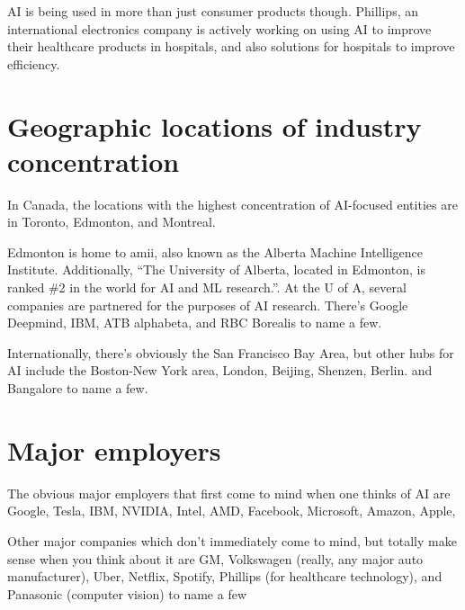 \documentclass[letterpaper,12pt]{article}
\begin{document}
AI is being used in more than just consumer products though. Phillips,
an international electronics company is actively working on using
AI to improve their healthcare products in hospitals, and also 
solutions for hospitals to improve efficiency.




\section{Geographic locations of industry concentration}

In Canada, the locations with the highest concentration of AI-focused
entities are in Toronto, Edmonton, and Montreal.\cite{investincanada}

Edmonton is home to amii, also known as the Alberta Machine Intelligence Institute.
Additionally, ``The University of Alberta, located in Edmonton, is ranked \#2 in the world for AI and ML research.''\cite{investincanada}\cite{edmonton.ai}.
At the U of A, several companies are partnered for the purposes of AI research.
There's Google Deepmind, IBM, ATB alphabeta, and RBC Borealis to name a few.

Internationally, there's obviously the San Francisco Bay Area,
but other hubs for AI include
the Boston-New York area,
London,
Beijing,
Shenzen,
Berlin.
and Bangalore to name a few.\cite{aihubs}\cite{aihubsreview}

\section{Major employers}

The obvious major employers that first come to mind when one thinks of AI are
Google,
Tesla,
IBM,
NVIDIA, Intel, AMD,
Facebook,
Microsoft,
Amazon,
Apple,



Other major companies which don't immediately come to mind, but totally make sense when you think about it are
GM,
Volkswagen (really, any major auto manufacturer),
Uber,
Netflix,
Spotify,
Phillips (for healthcare technology),
and
Panasonic (computer vision) to name a few
\cite{surpriseai}
\end{document}
